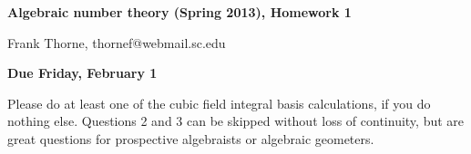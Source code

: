 \documentclass[12pt]{article}
\begin{document}
\setlength{\topmargin}{-2mm}





\begin{center}{\bf Algebraic number theory (Spring 2013), Homework 1}
\end{center}
\begin{center}Frank Thorne, thornef@webmail.sc.edu
\end{center}
\begin{center}
{\bf Due Friday, February 1}
\end{center}

Please do at least one of the cubic field integral basis calculations, if you do nothing else.
Questions 2 and 3 can be skipped without loss of continuity, but are great questions for prospective
algebraists or algebraic geometers.
\end{document}
